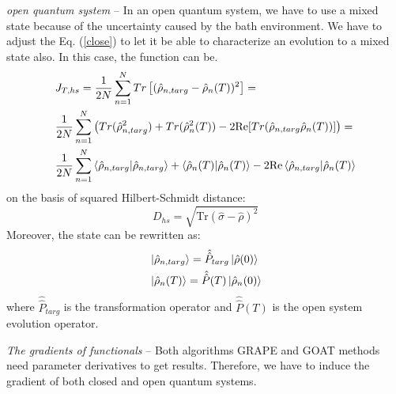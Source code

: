 \textit{open quantum system} -- In an open quantum system, we have to use a mixed state because of the uncertainty caused by the bath environment. We have to adjust the Eq. (\ref{close}) to let it be able to characterize an evolution to a mixed state also. In this case, the function can be.
\begin{equation}
    \begin{split}
        &J_{T,hs}=\frac{1}{2N}\sum_{n=1}^{N}Tr\left[(\hat{\rho}_{n,targ}-\hat{\rho}_{n}(T))^{2}\right]=\\
        &\frac{1}{2N}\sum_{n=1}^{N}\left(Tr(\hat{\rho}^{2}_{n,targ})+Tr(\hat{\rho}^{2}_{n}(T))-2\mathrm{Re}[Tr(\hat{\rho}_{n,targ}\hat{\rho}_{n}(T))]\right)=\\
        &\frac{1}{2N}\sum_{n=1}^{N}\braket{\hat{\rho}_{n,targ}|\hat{\rho}_{n,targ}}+\braket{\hat{\rho}_{n}(T)|\hat{\rho}_{n}(T)}-2\mathrm{Re}\braket{{\hat{\rho}_{n,targ}|\hat{\rho}_{n}(T)}}
    \end{split}
\end{equation}
on the basis of squared Hilbert-Schmidt distance:
\begin{equation}
    D_{hs}=\sqrt{\mathrm{Tr}(\hat{\sigma}-\hat{\rho})^{2}}
\end{equation}
Moreover, the state can be rewritten as:
\begin{equation}
    \begin{split}
        &\ket{\hat{\rho}_{n,targ}}=\hat{\hat{P}}_{targ}\ket{\hat{\rho}(0)}\\
        &\ket{\hat{\rho}_{n}(T)}=\hat{\hat{P}}(T)\ket{\hat{\rho}_{n}(0)}
    \end{split}
\end{equation}
where $\hat{\hat{P}}_{targ}$ is the transformation operator and $\hat{\hat{P}}(T)$ is the open system evolution operator.

\textit{The gradients of functionals} -- Both algorithms GRAPE and GOAT methods need parameter derivatives to get results. Therefore, we have to induce the gradient of both closed and open quantum systems.

